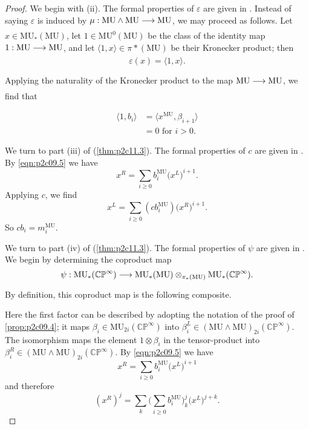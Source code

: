 \documentclass[../main]{subfiles}
\begin{document}
\begin{proof}
We begin with (ii). The formal properties of $\varepsilon$ are given in \cite{adams3}. Instead of saying $\varepsilon$ is induced by $\mu : \mathrm{MU} \wedge \mathrm{MU} \lar{} \mathrm{MU}$, we may proceed as follows. Let $x \in \mathrm{MU}_\ast(\mathrm{MU})$, let $1 \in \mathrm{MU}^0(\mathrm{MU})$ be the class of the identity map $1 : \mathrm{MU} \lar{} \mathrm{MU}$, and let $\langle 1, x\rangle \in \pi\ast(\mathrm{MU})$ be their Kronecker product; then \[\varepsilon(x) = \langle 1, x\rangle.\] 

Applying the naturality of the Kronecker product to the map $\mathrm{MU} \lar{} \mathrm{MU}$, we find that 

\begin{align*}
\langle 1, b_i\rangle & = \big\langle x^{\mathrm{MU}}, \beta_{i + 1}\big\rangle \\ & = 0 \text { for } i > 0.
\end{align*}

We turn to part (iii) of (\ref{thm:p2c11.3}). The formal properties of $c$ are given in \cite{adams3}. By \eqref{eqn:p2c09.5} we have \[x^R = \sum_{i \ge 0} b_i^{\mathrm{MU}} \big(x^L\big)^{i + 1}.\] Applying $c$, we find \[x^L = \sum_{i \ge 0} (c b_i^{\mathrm{MU}}) \big(x^R\big)^{i + 1}.\] So $c b_i = m_i^{\mathrm{MU}}$.

We turn to part (iv) of (\ref{thm:p2c11.3}). The formal properties of $\psi$ are given in \cite{adams3}. We begin by determining the coproduct map \[\psi : \mathrm{MU}_\ast(\mathbb {CP}^\infty) \lar{} \mathrm{MU}_\ast(\mathrm{MU}) \otimes_{\pi_\ast(\mathrm{MU})} \mathrm{MU}_\ast(\mathbb {CP}^\infty).\] By definition, this coproduct map is the following composite.

\begin{center}
\end{center}

Here the first factor can be described by adopting the notation of the proof of \eqref{prop:p2c09.4}; it maps $\beta_i \in \mathrm{MU}_{2i} (\mathbb {CP}^\infty)$ into $\beta_i^L \in (\mathrm{MU} \wedge \mathrm{MU})_{2i}(\mathbb {CP}^\infty)$. The isomorphism maps the element $1 \otimes \beta_i$ in the tensor-product into $\beta_i^R \in (\mathrm{MU} \wedge \mathrm{MU})_{2i}(\mathbb {CP}^\infty)$. By \eqref{eqn:p2c09.5} we have \[x^R = \sum_{i \ge 0} b_i^{\mathrm{MU}} \big(x^L\big)^{i + 1}\] and therefore \[(x^R)^j = \sum_k \bigg(\sum_{i \ge 0} b_i^{\mathrm{MU}}\bigg)_k^j \big(x^L\big)^{j + k}.\]


\end{proof}
\end{document}
